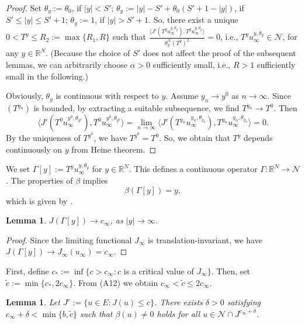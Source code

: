 \documentclass[10pt,a4paper]{amsart}
\numberwithin{equation}{section}
\newtheorem{lemma}[theorem]{Lemma}
\begin{document}
\begin{proof}
Set $\theta_y:=\theta_0$, if $|y|<S'$; $\theta_y:=|y|-S'+\theta_0(S'+1-|y|)$, if 
$S'\leq|y|\leq S'+1$;
$\theta_y:=1$, if $|y|>S'+1$. So, there exist a unique $0<T^y\leq R_2:=\max \{R_1,R\}$ 
such that $\frac{\langle J'(T^yu_{\infty}^{y,\theta_y}),T^yu_{\infty}^{y,\theta_y}\rangle}{\theta^N_y(T^y)^{2}}=0$, i.e., $T^y u_{\infty}^{y,\theta_y}\in\mathcal{N}$, for any $y\in{\mathbb{R}^N}$. (Because the choice of $S'$ does not affect the proof of the subsequent lemmas, we can 
arbitrarily choose $\alpha > 0$ sufficiently small, i.e., $R > 1$ sufficiently small in the following.)

Obviously, $\theta_y$ is continuous with respect to $y$. 
Assume $y_n\to y^0$ as $n\to\infty$. Since $(T^{y_n})$ is bounded, by extracting a suitable subsequence, we find $T^{y_n}\to T^0$. Then 
$$
\langle J'(T^0u_{\infty}^{y^0,\theta_{y^0}}),T^0u_{\infty}^{y^0,\theta_{y^0}}\rangle=\lim_{n\to\infty}\langle J'(T^{y_n}u_{\infty}^{y_n,\theta_{y_n}}),T^{y_n}u_{\infty}^{y_n,\theta_{y_n}}\rangle=0.
$$ 
By the uniqueness of $T^{y^0}$, we have $T^{y^0}=T^0$. So, we obtain that $T^y$  depends continuously on $y$ from Heine theorem.
\end{proof}

We set \(\Gamma[y] := T^y u_{\infty}^{y,\theta_y}\) for \(y \in \mathbb{R}^N\). 
This defines a continuous operator \(\Gamma: \mathbb{R}^N \to \mathcal{N}\). 
The properties of $\beta$ implies
\begin{equation}
\label{q8}\beta(\Gamma[y])=y, 
\end{equation} 
which is given by \cite[Lemma 3.13 ]{Lehrer}.

\begin{lemma}\label{L3.15} 
$J(\Gamma[y])\to c_\infty$, as $|y|\to\infty$.
\end{lemma}

\begin{proof}
Since the limiting functional $J_\infty$ is translation-invariant, we have 
$J(\Gamma[y]) \to J_\infty(u_\infty) = c_\infty$.
\end{proof}

First, define $c_*:=\inf\{c>c_\infty: c$ is a critical value of $J_\infty\}$. 
Then, set $\tilde{c}:=\min\{c_*,2c_\infty\}$. From (A12) we obtain 
$c_\infty<\tilde{c}\leq 2c_\infty$.

\begin{lemma}\label{L3.16} 
Let $J^c:=\{u\in E:J(u)\leq c\}$. There exists $\delta>0$  satisfying 
$c_\infty+\delta<\min\{b,\tilde{c}\}$ such that $\beta(u)\neq0$ holds for
all $u\in\mathcal{N}\cap J^{c_\infty+\delta}$. 
\end{lemma}
\end{document}
